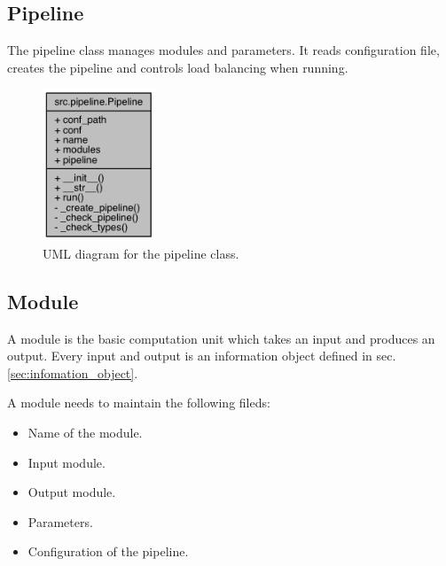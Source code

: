 \documentclass{article}
\begin{document}
    \subsection{Pipeline}
    The pipeline class manages modules and parameters.
    It reads configuration file, creates the pipeline and controls load balancing when running.

    \begin{figure}[h]
        \begin{center}
            \includegraphics[width=0.3\textwidth]{fig/pipeline_uml.png}
        \end{center}
        \label{fig:pipeline_uml}
        \caption{UML diagram for the pipeline class.}
    \end{figure}

    \subsection{Module}
    A module is the basic computation unit which takes an input and produces an output.
    Every input and output is an information object defined in sec. \ref{sec:infomation_object}.

    A module needs to maintain the following fileds:
    \begin{itemize}
        \item Name of the module.
        \item Input module.
        \item Output module.
        \item Parameters.
        \item Configuration of the pipeline.
    \end{itemize}
\end{document}
